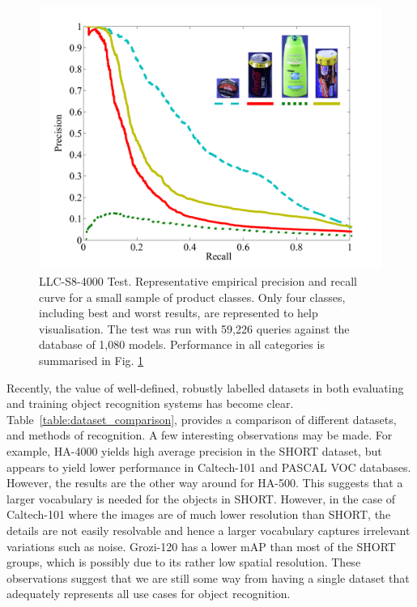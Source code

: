 \begin{figure}[h]
       \centering
		\includegraphics[width=\linewidth]{./gfx/Chapter03/precision-recall.pdf}
        \caption{LLC-S8-4000 Test. Representative empirical precision and recall curve for a small sample of product classes. Only four classes, including best and worst results, are represented to help visualisation. The test was run with 59,226 queries against the database of 1,080 models. Performance in all categories is summarised in Fig. \ref{fig:LLC-S8-4000}}
        \label{fig:LLC-S8-4000}
\end{figure}

Recently, the value of well-defined, robustly labelled datasets in both evaluating and training object recognition systems has become clear. Table~\ref{table:dataset_comparison}, provides a comparison of different datasets, and methods of recognition.  A few interesting observations may be made. For example, HA-4000 yields high average precision in the SHORT dataset, but appears to yield lower performance in Caltech-101 and PASCAL VOC databases. However, the results are the other way around for HA-500.  This suggests that a larger vocabulary is needed for the objects in SHORT. However, in the case of Caltech-101 where the images are of much lower resolution than SHORT, the details are not easily resolvable and hence a larger vocabulary captures irrelevant variations such as noise. Grozi-120 has a lower mAP than most of the SHORT groups, which is possibly due to its rather low spatial resolution. These observations suggest that we are still some way from having a single dataset that adequately represents all use cases for object recognition.


